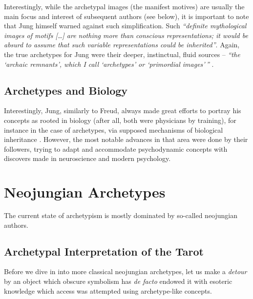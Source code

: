 \documentclass[
]{book}
\begin{document}
Interestingly, while the archetypal images (the manifest motives) are usually the main focus and interest of subsequent authors (see below), it is important to note that Jung himself warned against such simplification. Such \emph{``definite mythological images of motifs {[}\ldots{]} are nothing more than conscious representations; it would be absurd to assume that such variable representations could be inherited''}. Again, the true archetypes for Jung were their deeper, instinctual, fluid sources -- \emph{``the `archaic remnants', which I call `archetypes' or `primordial images'\,''} \citep{jung1964approaching}.

\hypertarget{archetypes-and-biology}{%
\subsection{Archetypes and Biology}\label{archetypes-and-biology}}

Interestingly, Jung, similarly to Freud, always made great efforts to portray his concepts as rooted in biology (after all, both were physicians by training), for instance in the case of archetypes, via supposed mechanisms of biological inheritance \citep[which is no longer supported by modern genetics modern genetics;][]{roesler2012archetypes}. However, the most notable advances in that area were done by their followers, trying to adapt and accommodate psychodynamic concepts with discovers made in neuroscience and modern psychology.

\hypertarget{neojungian-archetypes}{%
\section{Neojungian Archetypes}\label{neojungian-archetypes}}

The current state of archetypism is mostly dominated by so-called neojungian authors.

\hypertarget{archetypal-interpretation-of-the-tarot}{%
\subsection{Archetypal Interpretation of the Tarot}\label{archetypal-interpretation-of-the-tarot}}

Before we dive in into more classical neojungian archetypes, let us make a \emph{detour} by an object which obscure symbolism has \emph{de facto} endowed it with esoteric knowledge which access was attempted using archetype-like concepts.
\end{document}
